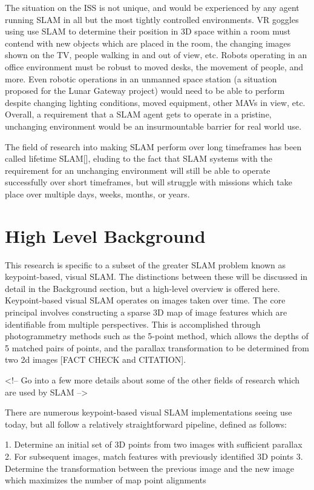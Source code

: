 \documentclass[12pt]{article}
\begin{document}
The situation on the ISS is not unique, and would be experienced by any agent running SLAM in all but the most tightly controlled environments. VR goggles using use SLAM to determine their position in 3D space within a room must contend with new objects which are placed in the room, the changing images shown on the TV, people walking in and out of view, etc. Robots operating in an office environment must be robust to moved desks, the movement of people, and more. Even robotic operations in an unmanned space station (a situation proposed for the Lunar Gateway project) would need to be able to perform despite changing lighting conditions, moved equipment, other MAVs in view, etc. Overall, a requirement that a SLAM agent gets to operate in a pristine, unchanging environment would be an insurmountable barrier for real world use.

The field of research into making SLAM perform over long timeframes has been called lifetime SLAM[], eluding to the fact that SLAM systems with the requirement for an unchanging environment will still be able to operate successfully over short timeframes, but will struggle with missions which take place over multiple days, weeks, months, or years.

\section{High Level Background}

This research is specific to a subset of the greater SLAM problem known as keypoint-based, visual SLAM. The distinctions between these will be discussed in detail in the Background section, but a high-level overview is offered here. Keypoint-based visual SLAM operates on images taken over time. The core principal involves constructing a sparse 3D map of image features which are identifiable from multiple perspectives. This is accomplished through photogrammetry methods such as the 5-point method, which allows the depths of 5 matched pairs of points, and the parallax transformation to be determined from two 2d images [FACT CHECK and CITATION].

<!-- Go into a few more details about some of the other fields of research which are used by SLAM -->

There are numerous keypoint-based visual SLAM implementations seeing use today, but all follow a relatively straightforward pipeline, defined as follows:

1. Determine an initial set of 3D points from two images with sufficient parallax
2. For subsequent images, match features with previously identified 3D points
3. Determine the transformation between the previous image and the new image which maximizes the number of map point alignments
\end{document}
